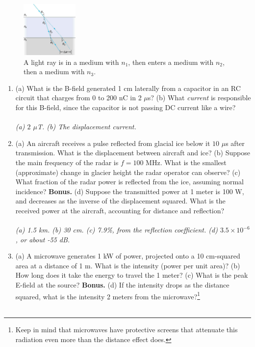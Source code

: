 \documentclass[12pt,twocolumn]{article}
\begin{document}
\begin{figure}[ht]
\centering
\includegraphics[width=0.25\textwidth]{lens_1.jpeg}
\caption{\label{fig:lens_1} \small A light ray is in a medium with $n_1$, then enters a medium with $n_2$, then a medium with $n_3$.}
\end{figure}

\noindent
\begin{enumerate}
\item (a) What is the B-field generated 1 cm laterally from a capacitor in an RC circuit that charges from 0 to 200 nC in 2 $\mu$s? (b) What \textit{current} is responsible for this B-field, since the capacitor is not passing DC current like a wire? \\ \\
\textit{(a) $2$ $\mu$T. (b) The displacement current.}
\item (a) An aircraft receives a pulse reflected from glacial ice below it $10$ $\mu$s after transmission. What is the displacement between aircraft and ice? (b) Suppose the main frequency of the radar is $f = 100$ MHz.  What is the smallest (approximate) change in glacier height the radar operator can observe? (c) What fraction of the radar power is reflected from the ice, assuming normal incidence? \textbf{Bonus.} (d) Suppose the transmitted power at 1 meter is 100 W, and decreases as the inverse of the displacement squared.  What is the received power at the aircraft, accounting for distance and reflection? \\ \\
\textit{(a) 1.5 km. (b) 30 cm. (c) 7.9\%, from the reflection coefficient. (d) $3.5 \times 10^{-6}$, or about -55 dB.}
\item (a) A microwave generates 1 kW of power, projected onto a 10 cm-squared area at a distance of 1 m.  What is the intensity (power per unit area)? (b) How long does it take the energy to travel the 1 meter? (c) What is the peak E-field at the source?  \textbf{Bonus.} (d) If the intensity drops as the distance squared, what is the intensity 2 meters from the microwave?\footnote{Keep in mind that microwaves have protective screens that attenuate this radiation even more than the distance effect does.}\\ \\

\end{enumerate}
\end{document}
